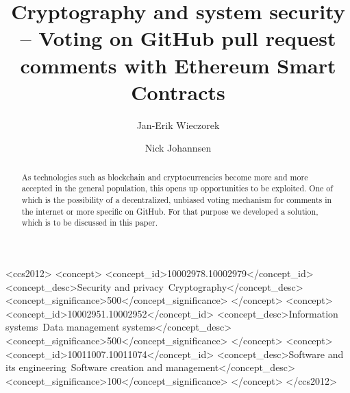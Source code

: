 \documentclass[sigconf]{acmart}
\begin{document}
\title{Cryptography and system security -- Voting on GitHub pull request comments with Ethereum Smart Contracts}




\author{Jan-Erik Wieczorek}
 
\author{Nick Johannsen}



\begin{abstract}
As technologies such as blockchain and cryptocurrencies become more and more accepted in the general population, this opens up opportunities to be exploited. One of which is the possibility of a decentralized, unbiased voting mechanism for comments in the internet or more specific on GitHub. For that purpose we developed a solution, which is to be discussed in this paper.
\end{abstract}

\begin{CCSXML}
<ccs2012>
   <concept>
       <concept_id>10002978.10002979</concept_id>
       <concept_desc>Security and privacy~Cryptography</concept_desc>
       <concept_significance>500</concept_significance>
       </concept>
   <concept>
       <concept_id>10002951.10002952</concept_id>
       <concept_desc>Information systems~Data management systems</concept_desc>
       <concept_significance>500</concept_significance>
       </concept>
   <concept>
       <concept_id>10011007.10011074</concept_id>
       <concept_desc>Software and its engineering~Software creation and management</concept_desc>
       <concept_significance>100</concept_significance>
       </concept>
 </ccs2012>
\end{CCSXML}

\end{document}
